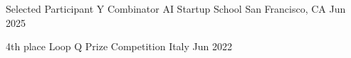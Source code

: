 


\begin{cvhonors}

  \cvhonor
    {Selected Participant} %
    {Y Combinator AI Startup School} %
    {San Francisco, CA} %
    {Jun 2025} %

  
  \cvhonor
    {4th place} %
    {Loop Q Prize Competition} %
    {Italy} %
    {Jun 2022} %


\end{cvhonors}